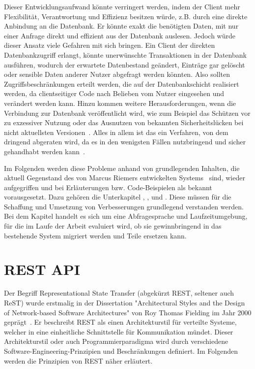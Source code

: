 Dieser Entwicklungsaufwand könnte verringert werden, indem der Client mehr Flexibilität, Verantwortung und Effizienz besitzen würde,
z.B. durch eine direkte Anbindung an die Datenbank.
Er könnte exakt die benötigten Daten, mit nur einer Anfrage direkt und effizient aus der Datenbank auslesen.
Jedoch würde dieser Ansatz viele Gefahren mit sich bringen. Ein Client der direkten Datenbankzugriff erlangt,
könnte unerwünschte Transaktionen in der Datenbank ausführen, wodurch der erwartete Datenbestand geändert,
Einträge gar gelöscht oder sensible Daten anderer Nutzer abgefragt werden könnten. Also sollten Zugriffsbeschränkungen erteilt werden, die
auf der Datenbankschicht realisiert werden, da clientseitiger Code nach Belieben vom Nutzer eingesehen und verändert werden kann.
Hinzu kommen weitere Herausforderungen, wenn die Verbindung zur Datenbank veröffentlicht wird,
wie zum Beispiel das Schützen vor zu exzessiver Nutzung oder das Ausnutzen von bekannten Sicherheitslücken bei nicht aktuellsten Versionen~\cite{postgresql-security}.
Alles in allem ist das ein Verfahren, von dem dringend abgeraten wird, da es in den wenigsten Fällen nutzbringend und sicher gehandhabt werden kann~\cite{client-to-database}.

Im Folgenden werden diese Probleme anhand von grundlegenden Inhalten, die aktuell Gegenstand des von Marcus Riemers entwickelten Systems~\cite{riemer2016} sind,
wieder aufgegriffen und bei Erläuterungen bzw. Code-Beispielen als bekannt vorausgesetzt.
Dazu gehören die Unterkapitel , ,  und .
Diese müssen für die Schaffung und Umsetzung von Verbesserungen grundlegend verstanden werden.
Bei dem Kapitel  handelt es sich um eine Abfragesprache und Laufzeitumgebung,
für die im Laufe der Arbeit evaluiert wird, ob sie gewinnbringend in das bestehende System migriert werden und Teile ersetzen kann.

\section{REST API}
\label{sec:basics:restapi}
Der Begriff Representational State Transfer (abgekürzt REST, seltener auch ReST) wurde erstmalig in der Dissertation "Architectural Styles and the Design of
Network-based Software Architectures" von Roy Thomas Fielding im Jahr 2000 geprägt~\cite{fielding-dissertation}.
Er beschreibt REST als einen Architekturstil für verteilte Systeme, welcher in eine einheitliche Schnittstelle für Kommunikation mündet.
Dieser Architekturstil oder auch Programmierparadigma wird durch verschiedene Software-Engineering-Prinzipien und Beschränkungen definiert.
Im Folgenden werden die Prinzipien von REST näher erläutert.

